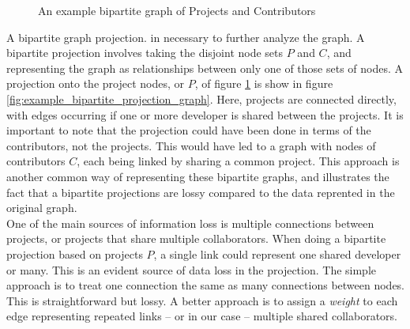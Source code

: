 \documentclass{proc}
\begin{document}
\begin{figure}
\label{fig:example_bipartite_graph}
\centering
{}
\caption{An example bipartite graph of Projects and Contributors}
\end{figure}

A bipartite graph projection. in necessary to further analyze the graph. A bipartite projection involves taking the disjoint node sets $P$ and $C$, and representing the graph as relationships between only one of those sets of nodes. A projection onto the project nodes, or $P$, of figure \ref{fig:example_bipartite_graph} is show in figure \ref{fig:example_bipartite_projection_graph}. Here, projects are connected directly, with edges occurring if one or more developer is shared between the projects. It is important to note that the projection could have been done in terms of the contributors, not the projects. This would have led to a graph with nodes of contributors $C$, each being linked by sharing a common project. This approach is another common way of representing these bipartite graphs\cite{newman2001scientific}, and illustrates the fact that a bipartite projections are lossy compared to the data reprented in the original graph\cite{zhou2007bipartite}.\\

One of the main sources of information loss is multiple connections between projects, or projects that share multiple collaborators. When doing a bipartite projection based on projects $P$, a single link could represent one shared developer or many. This is an evident source of data loss in the projection. The simple approach is to treat one connection the same as many connections between nodes. This is straightforward but lossy\cite{zhou2007bipartite,grossman1995portion}. A better approach is to assign a \textit{weight} to each edge representing repeated links -- or in our case -- multiple shared collaborators\cite{zha2001bipartite}.
\end{document}
